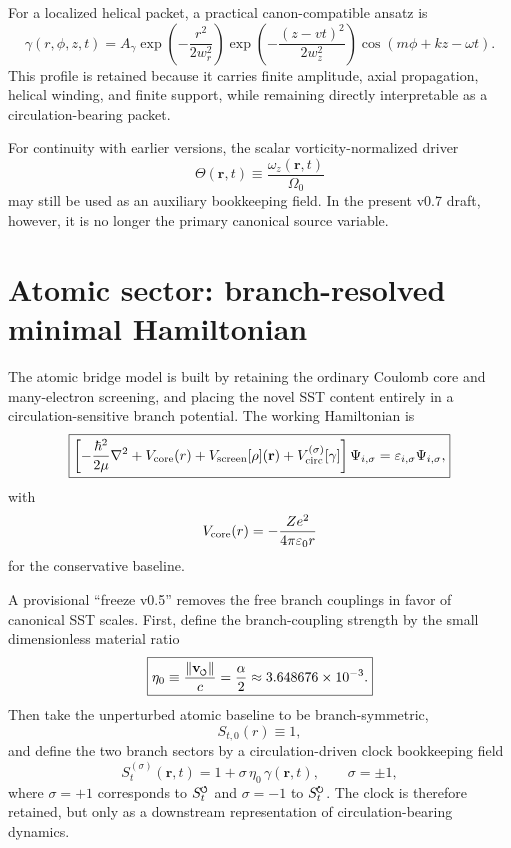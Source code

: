 \documentclass[11pt,a4paper]{article}
\newcommand{\swirlarrow}{\mathchoice{\mkern-2mu\scriptstyle\boldsymbol{\circlearrowleft}}{\mkern-2mu\scriptstyle\boldsymbol{\circlearrowleft}}{\mkern-2mu\scriptscriptstyle\boldsymbol{\circlearrowleft}}{\mkern-2mu\scriptscriptstyle\boldsymbol{\circlearrowleft}}}
\newcommand{\swirlarrowcw}{\mathchoice{\mkern-2mu\scriptstyle\boldsymbol{\circlearrowright}}{\mkern-2mu\scriptstyle\boldsymbol{\circlearrowright}}{\mkern-2mu\scriptscriptstyle\boldsymbol{\circlearrowright}}{\mkern-2mu\scriptscriptstyle\boldsymbol{\circlearrowright}}}
\newcommand{\vswirl}{\mathbf{v}_{\swirlarrow}}
\newcommand{\SwirlClock}{S_t^{\swirlarrow}}
\newcommand{\SwirlClockcw}{S_t^{\swirlarrowcw}}
\begin{document}
For a localized helical packet, a practical canon-compatible ansatz is
\begin{equation}
\label{eq:gammaPacket}
\gamma(r,\phi,z,t)
=
A_\gamma
\exp\!\left(-\frac{r^2}{2w_r^2}\right)
\exp\!\left(-\frac{(z-vt)^2}{2w_z^2}\right)
\cos\!\left(m\phi+kz-\omega t\right).
\end{equation}
This profile is retained because it carries finite amplitude, axial propagation, helical winding, and finite support, while remaining directly interpretable as a circulation-bearing packet.

For continuity with earlier versions, the scalar vorticity-normalized driver
\begin{equation}
\label{eq:ThetaDef}
\Theta(\mathbf r,t) \equiv \frac{\omega_z(\mathbf r,t)}{\Omega_0}
\end{equation}
may still be used as an auxiliary bookkeeping field. In the present v0.7 draft, however, it is no longer the primary canonical source variable.

\section{Atomic sector: branch-resolved minimal Hamiltonian}
The atomic bridge model is built by retaining the ordinary Coulomb core and many-electron screening, and placing the novel SST content entirely in a circulation-sensitive branch potential. The working Hamiltonian is
\begin{equation}
\label{eq:master-H}
\boxed{
\left[
-\frac{\hbar^2}{2\mu}\nabla^2
+V_{\rm core}(r)
+V_{\rm screen}[\rho](\mathbf r)
+V_{\rm circ}^{(\sigma)}[\gamma]
\right]\Psi_{i,\sigma}
=\varepsilon_{i,\sigma}\Psi_{i,\sigma},
}
\end{equation}
with
\begin{equation}
\label{eq:Vcore}
V_{\rm core}(r)=-\frac{Ze^2}{4\pi\varepsilon_0 r}
\end{equation}
for the conservative baseline.

A provisional ``freeze v0.5'' removes the free branch couplings in favor of canonical SST scales. First, define the branch-coupling strength by the small dimensionless material ratio
\begin{equation}
\label{eq:eta0}
\boxed{
\eta_0 \equiv \frac{\lVert\vswirl\rVert}{c} = \frac{\alpha}{2} \approx 3.648676\times 10^{-3}.
}
\end{equation}
Then take the unperturbed atomic baseline to be branch-symmetric,
\begin{equation}
\label{eq:St0freeze}
S_{t,0}(r)\equiv 1,
\end{equation}
and define the two branch sectors by a circulation-driven clock bookkeeping field
\begin{equation}
\label{eq:StBranches}
\boxed{
S_t^{(\sigma)}(\mathbf r,t)=1+\sigma\,\eta_0\,\gamma(\mathbf r,t),
\qquad
\sigma=\pm 1,
}
\end{equation}
where $\sigma=+1$ corresponds to $\SwirlClock$ and $\sigma=-1$ to $\SwirlClockcw$. The clock is therefore retained, but only as a downstream representation of circulation-bearing dynamics.
\end{document}
